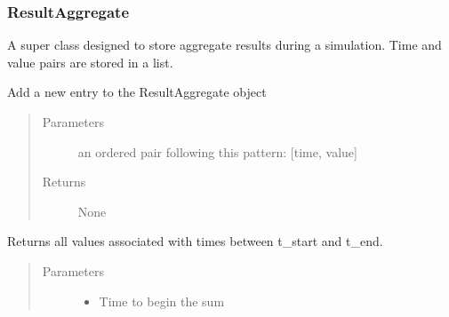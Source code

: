 \documentclass[letterpaper,10pt,english]{sphinxmanual}
\begin{document}
\subsubsection{ResultAggregate}
\label{\detokenize{index:resultaggregate}}

\begin{fulllineitems}
\label{\detokenize{index:feast.EmissionSimModules.result_classes.ResultAggregate}}
A super class designed to store aggregate results during a simulation.
Time and value pairs are stored in a list.

\begin{fulllineitems}
\label{\detokenize{index:feast.EmissionSimModules.result_classes.ResultAggregate.append_entry}}
Add a new entry to the ResultAggregate object
\begin{quote}\begin{description}
\item[{Parameters}] \leavevmode
{} \textendash{} an ordered pair following this pattern: {[}time, value{]}

\item[{Returns}] \leavevmode
None

\end{description}\end{quote}

\end{fulllineitems}


\begin{fulllineitems}
\label{\detokenize{index:feast.EmissionSimModules.result_classes.ResultAggregate.get_vals}}
Returns all values associated with times between t\_start and t\_end.
\begin{quote}\begin{description}
\item[{Parameters}] \leavevmode\begin{itemize}
\item {} 
 \textendash{} Time to begin the sum


\end{itemize}
\end{description}
\end{quote}
\end{fulllineitems}
\end{fulllineitems}
\end{document}
